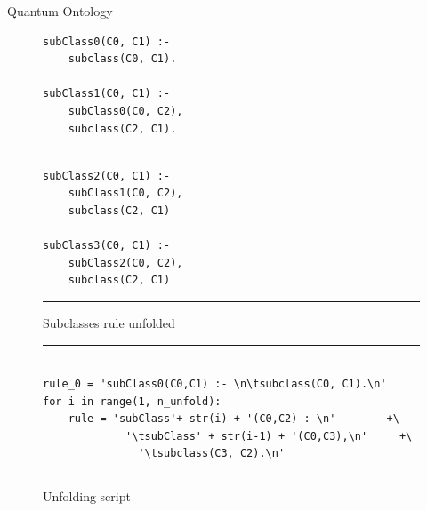 \begin{frame}[fragile]{Quantum Ontology}
\begin{minipage}{.55\linewidth}
\begin{figure}[h]
\begin{minipage}{.45\linewidth}
\begin{verbatim}
subClass0(C0, C1) :-
	subclass(C0, C1).
	
subClass1(C0, C1) :-
	subClass0(C0, C2),
	subclass(C2, C1).
	
				\end{verbatim}
			\end{minipage}
			\hfill
			\begin{minipage}{.45\linewidth}
				\begin{verbatim}
subClass2(C0, C1) :-
	subClass1(C0, C2),
	subclass(C2, C1)
	
subClass3(C0, C1) :-
	subClass2(C0, C2),
	subclass(C2, C1)
				\end{verbatim}
			\end{minipage}
			\hrule
			\caption{Subclasses rule unfolded}
		\end{figure}
		\vspace{-.5cm}
		\begin{figure}[h]
			\begin{minipage}{\linewidth}
				\hrule
				\begin{verbatim}
					
rule_0 = 'subClass0(C0,C1) :- \n\tsubclass(C0, C1).\n'
for i in range(1, n_unfold):
	rule = 'subClass'+ str(i) + '(C0,C2) :-\n'        +\
		     '\tsubClass' + str(i-1) + '(C0,C3),\n'     +\
			   '\tsubclass(C3, C2).\n'
				\end{verbatim}
				\hrule
			\end{minipage}
			\caption{Unfolding script}
		\end{figure}
	\end{minipage}
\end{frame}

